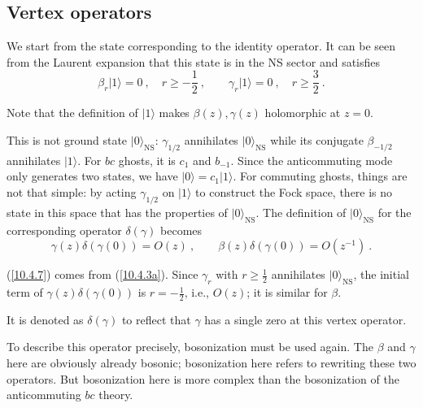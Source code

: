 	\subsection*{Vertex operators}
	We start from the state corresponding to the identity operator. It can be seen from the Laurent expansion that this state is in the NS sector and satisfies
	\begin{equation}
		\beta_{r}\lvert 1\rangle =0\:, \quad r\geq -\frac{1}{2} \:, \qquad
		\gamma_{r}\lvert1\rangle=0 \:, \quad r\geq \frac{3}{2}\:. \label{10.4.6}
	\end{equation}
	\begin{tcolorbox}[breakable]
		Note that the definition of $\lvert 1\rangle$ makes $\beta(z),\gamma(z)$ holomorphic at $z=0$.
	\end{tcolorbox}
	\noindent This is not ground state $\lvert 0\rangle_{\mathrm{NS}}$: $\gamma_{1/2}$ annihilates $\lvert 0\rangle_{\mathrm{NS}}$ while its conjugate $\beta_{-1/2}$ annihilates $\lvert 1\rangle$. For $bc$ ghosts, it is $c_{1}$ and $b_{-1}$. Since the anticommuting mode only generates two states, we have $\lvert 0\rangle =c_{1}\lvert 1\rangle$. For commuting ghosts, things are not that simple: by acting $\gamma_{1/2}$ on $\lvert 1\rangle$ to construct the Fock space, there is no state in this space that has the properties of $\lvert 0\rangle_{\mathrm{NS}}$. The definition of $\lvert 0\rangle_{\mathrm{NS}}$ for the corresponding operator $\delta(\gamma)$ becomes
	\begin{equation}
		\gamma(z)\delta(\gamma(0)) = O(z) \:, \qquad
		\beta(z) \delta(\gamma(0)) = O(z^{-1})\:. \label{10.4.7}
	\end{equation}
	\begin{tcolorbox}[breakable]
		(\ref{10.4.7}) comes from (\ref{10.4.3a}). Since $\gamma_{r}$ with $r\geq \frac{1}{2}$ annihilates $\lvert 0\rangle_{\mathrm{NS}}$, the initial term of $\gamma(z)\delta(\gamma(0))$ is $r=-\frac{1}{2}$, i.e., $O(z)$; it is similar for $\beta$.
	\end{tcolorbox}
	\noindent It is denoted as $\delta(\gamma)$ to reflect that $\gamma$ has a single zero at this vertex operator. 
	
	To describe this operator precisely, bosonization must be used again. The $\beta$ and $\gamma$ here are obviously already bosonic; bosonization here refers to rewriting these two operators. But bosonization here is more complex than the bosonization of the anticommuting $bc$ theory.
	
